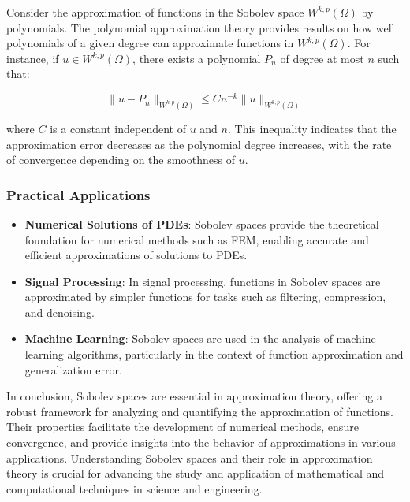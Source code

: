 \documentclass[11pt,a4paper]{article}
\begin{document}
Consider the approximation of functions in the Sobolev space \(W^{k,p}(\Omega)\) by polynomials. The polynomial approximation theory provides results on how well polynomials of a given degree can approximate functions in \(W^{k,p}(\Omega)\). For instance, if \(u \in W^{k,p}(\Omega)\), there exists a polynomial \(P_n\) of degree at most \(n\) such that:

\[
\|u - P_n\|_{W^{k,p}(\Omega)} \leq C n^{-k} \|u\|_{W^{k,p}(\Omega)}
\]

where \(C\) is a constant independent of \(u\) and \(n\). This inequality indicates that the approximation error decreases as the polynomial degree increases, with the rate of convergence depending on the smoothness of \(u\).

\subsubsection{Practical Applications}

\begin{itemize}
    \item \textbf{Numerical Solutions of PDEs}: Sobolev spaces provide the theoretical foundation for numerical methods such as FEM, enabling accurate and efficient approximations of solutions to PDEs.
    \item \textbf{Signal Processing}: In signal processing, functions in Sobolev spaces are approximated by simpler functions for tasks such as filtering, compression, and denoising.
    \item \textbf{Machine Learning}: Sobolev spaces are used in the analysis of machine learning algorithms, particularly in the context of function approximation and generalization error.
\end{itemize}

In conclusion, Sobolev spaces are essential in approximation theory, offering a robust framework for analyzing and quantifying the approximation of functions. Their properties facilitate the development of numerical methods, ensure convergence, and provide insights into the behavior of approximations in various applications. Understanding Sobolev spaces and their role in approximation theory is crucial for advancing the study and application of mathematical and computational techniques in science and engineering.
\end{document}
